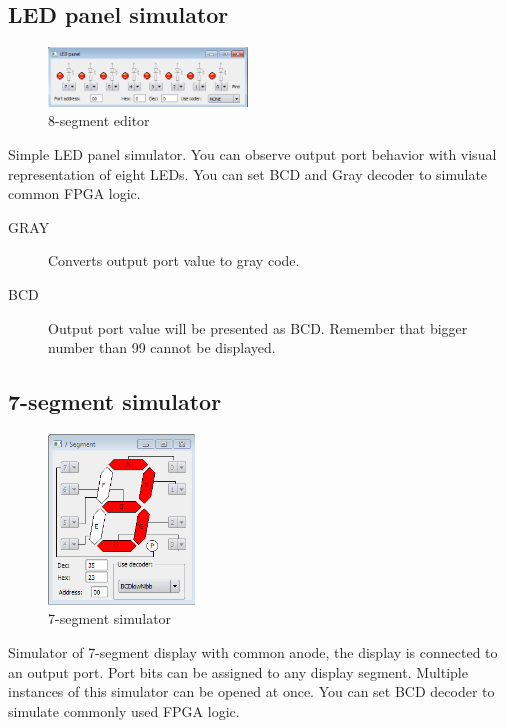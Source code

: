     \subsection{LED panel simulator}
        \begin{figure}
            \centering
            \includegraphics[width=150pt]{img/Led_panel.png}
            \caption{8-segment editor}
        \end{figure}

        Simple LED panel simulator. You can observe output port behavior with visual representation of eight LEDs. You can
        set BCD and Gray decoder to simulate common FPGA logic.

        \begin{description}
            \item[GRAY] Converts output port value to gray code.
            \item[BCD] Output port value will be presented as BCD. Remember that bigger number than 99 cannot be displayed.
        \end{description}

    \subsection{7-segment simulator}
        \begin{figure}
            \centering
            \includegraphics[width=110pt]{img/7seg_sim.png}
            \caption{7-segment simulator}
        \end{figure}
        Simulator of 7-segment display with common anode, the display is connected to an output port. Port bits can be
        assigned to any display segment. Multiple instances of this simulator can be opened at once. You can set BCD decoder
        to simulate commonly used FPGA logic.


